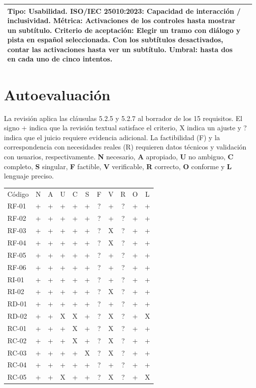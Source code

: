 \documentclass[11pt,a4paper]{article}
\begin{document}
\begin{longtable}{|p{}|p{}|}
\textbf{Tipo:} Usabilidad.\newline
\textbf{ISO/IEC 25010:2023:} Capacidad de interacción / inclusividad.\newline
\textbf{Métrica:} Activaciones de los controles hasta mostrar un subtítulo.\newline
\textbf{Criterio de aceptación:} Elegir un tramo con diálogo y pista en español seleccionada. Con los subtítulos desactivados, contar las activaciones hasta ver un subtítulo. Umbral: hasta dos en cada uno de cinco intentos. \\ \hline
\end{longtable}
\endgroup

\section{Autoevaluación}
La revisión aplica las cláusulas 5.2.5 y 5.2.7
\cite[cls. 5.2.5 y 5.2.7]{ieee29148} al borrador de los 15 requisitos.
El signo + indica que la revisión textual satisface el criterio,
X indica un ajuste y ? indica que el juicio requiere evidencia adicional.
La factibilidad (F) y la correspondencia con necesidades reales (R)
requieren datos técnicos y validación con usuarios, respectivamente.
\textbf{N} necesario, \textbf{A} apropiado, \textbf{U} no ambiguo,
\textbf{C} completo, \textbf{S} singular, \textbf{F} factible,
\textbf{V} verificable, \textbf{R} correcto, \textbf{O} conforme y
\textbf{L} lenguaje preciso.

\begin{center}\small
\begin{tabular}{l*{10}{c}}
\rowcolor{gray!15} Código & N & A & U & C & S & F & V & R & O & L \\
RF-01 & + & + & + & + & + & ? & + & ? & + & + \\
RF-02 & + & + & + & + & + & ? & + & ? & + & + \\
RF-03 & + & + & + & + & + & ? & X & ? & + & + \\
RF-04 & + & + & + & + & + & ? & X & ? & + & + \\
RF-05 & + & + & + & + & + & ? & + & ? & + & + \\
RF-06 & + & + & + & + & + & ? & + & ? & + & + \\
RI-01 & + & + & + & + & + & ? & + & ? & + & + \\
RI-02 & + & + & + & + & + & ? & X & ? & + & + \\
RD-01 & + & + & + & + & + & ? & + & ? & + & + \\
RD-02 & + & + & X & X & + & ? & X & ? & + & X \\
RC-01 & + & + & + & X & + & ? & X & ? & + & + \\
RC-02 & + & + & + & X & + & ? & X & ? & + & + \\
RC-03 & + & + & + & + & X & ? & X & ? & + & + \\
RC-04 & + & + & + & + & + & ? & + & ? & + & + \\
RC-05 & + & + & X & + & + & ? & X & ? & + & X \\
\end{tabular}
\end{center}
\end{document}
